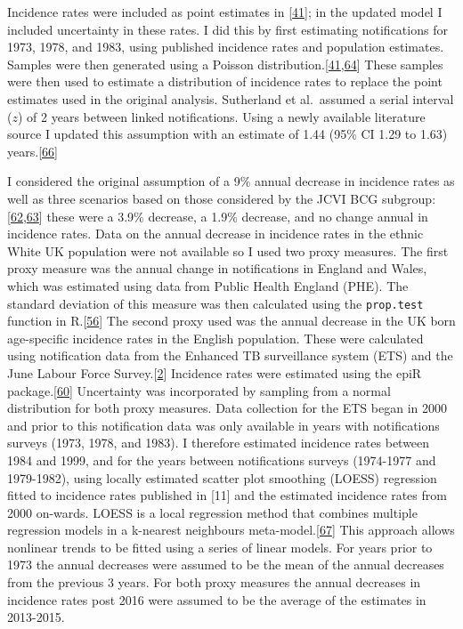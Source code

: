 \documentclass[11pt,twoside]{bristolthesis}
\begin{document}
  Incidence rates were included as point estimates in {[}\protect\hyperlink{ref-Sutherland1989}{41}{]}; in the updated model I included uncertainty in these rates. I did this by first estimating notifications for 1973, 1978, and 1983, using published incidence rates and population estimates. Samples were then generated using a Poisson distribution.{[}\protect\hyperlink{ref-Sutherland1989}{41},\protect\hyperlink{ref-Sutherland1987a}{64}{]} These samples were then used to estimate a distribution of incidence rates to replace the point estimates used in the original analysis. Sutherland et al.~assumed a serial interval (\(z\)) of 2 years between linked notifications. Using a newly available literature source I updated this assumption with an estimate of 1.44 (95\% CI 1.29 to 1.63) years.{[}\protect\hyperlink{ref-Borgdorff2011}{66}{]}
  
  I considered the original assumption of a 9\% annual decrease in incidence rates as well as three scenarios based on those considered by the JCVI BCG subgroup:{[}\protect\hyperlink{ref-JVCIBCG2002}{62},\protect\hyperlink{ref-JVCIBCG2003}{63}{]} these were a 3.9\% decrease, a 1.9\% decrease, and no change annual in incidence rates. Data on the annual decrease in incidence rates in the ethnic White UK population were not available so I used two proxy measures. The first proxy measure was the annual change in notifications in England and Wales, which was estimated using data from Public Health England (PHE). The standard deviation of this measure was then calculated using the \texttt{prop.test} function in R.{[}\protect\hyperlink{ref-R}{56}{]} The second proxy used was the annual decrease in the UK born age-specific incidence rates in the English population. These were calculated using notification data from the Enhanced TB surveillance system (ETS) and the June Labour Force Survey.{[}\protect\hyperlink{ref-PHE2017}{2}{]} Incidence rates were estimated using the epiR package.{[}\protect\hyperlink{ref-EpiR}{60}{]} Uncertainty was incorporated by sampling from a normal distribution for both proxy measures. Data collection for the ETS began in 2000 and prior to this notification data was only available in years with notifications surveys (1973, 1978, and 1983). I therefore estimated incidence rates between 1984 and 1999, and for the years between notifications surveys (1974-1977 and 1979-1982), using locally estimated scatter plot smoothing (LOESS) regression fitted to incidence rates published in {[}11{]} and the estimated incidence rates from 2000 on-wards. LOESS is a local regression method that combines multiple regression models in a k-nearest neighbours meta-model.{[}\protect\hyperlink{ref-FoxSnow:2019}{67}{]} This approach allows nonlinear trends to be fitted using a series of linear models. For years prior to 1973 the annual decreases were assumed to be the mean of the annual decreases from the previous 3 years. For both proxy measures the annual decreases in incidence rates post 2016 were assumed to be the average of the estimates in 2013-2015.
  
\end{document}
